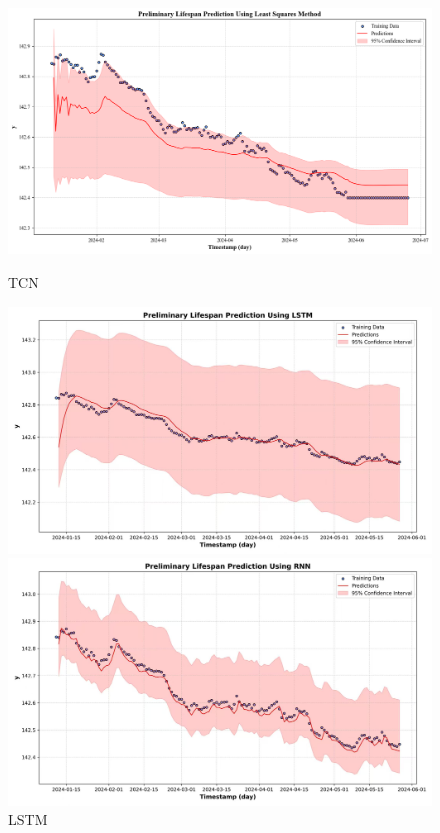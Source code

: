 \begin{figure}[H]
	\centering
	\begin{minipage}[t]{\linewidth}
		\centering
		\includegraphics[width=\linewidth]{figures/Prediction_TCN}
		\caption*{TCN}
	\end{minipage}
	\vfill
	\begin{minipage}[t]{\linewidth}
		\centering
		\includegraphics[width=\linewidth]{figures/Prediction_LSTM}
		\caption*{LSTM}
	\end{minipage}
	\vfill
	\begin{minipage}[t]{\linewidth}
		\centering
		\includegraphics[width=\linewidth]{figures/Prediction_RNN}

\end{minipage}
\end{figure}
